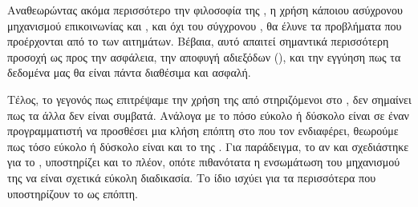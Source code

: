 Αναθεωρώντας ακόμα περισσότερο την φιλοσοφία της , η
χρήση κάποιου ασύχρονου μηχανισμού επικοινωνίας  και ,
και όχι του σύγχρονου , θα έλυνε τα προβλήματα που
προέρχονται από το  των αιτημάτων. Βέβαια, αυτό
απαιτεί σημαντικά περισσότερη
προσοχή ως προς την ασφάλεια, την αποφυγή αδιεξόδων (),
και την εγγύηση πως τα δεδομένα μας θα είναι πάντα διαθέσιμα
και ασφαλή.
\newline

Τέλος, το γεγονός πως επιτρέψαμε την χρήση της  από
 στηριζόμενοι στο , δεν σημαίνει πως τα άλλα
 δεν είναι συμβατά. Ανάλογα με το πόσο εύκολο
ή δύσκολο είναι σε έναν προγραμματιστή να προσθέσει μια
κλήση επόπτη στο  που τον ενδιαφέρει, θεωρούμε
πως τόσο εύκολο ή δύσκολο είναι και το  της .
Για παράδειγμα, το  αν και σχεδιάστηκε για το
, υποστηρίζει και το  πλέον, οπότε πιθανότατα
η ενσωμάτωση του μηχανισμού της  να είναι
σχετικά εύκολη διαδικασία. Το ίδιο ισχύει για τα
περισσότερα  που υποστηρίζουν το  ως επόπτη.
